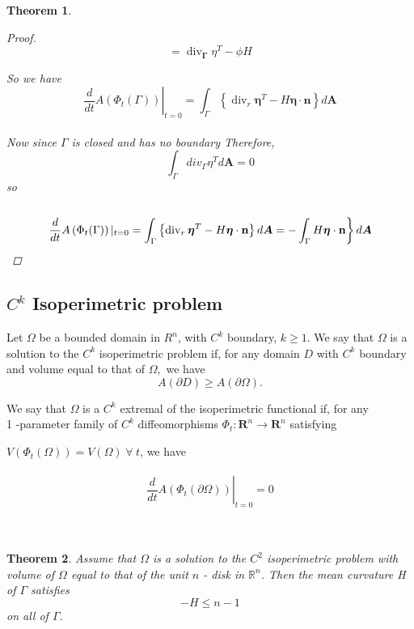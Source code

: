 \documentclass[oneside]{book}
\newtheorem{theorem}{Theorem}[section]
\begin{document}
\begin{theorem}
\begin{proof}
			
			
			
			$$
			{=\operatorname{div}_{\mathbf{\Gamma}} {\eta}^{T}-{\phi}{H}}
			$$
			
			So we have \\
			$$
			\left.\frac{d}{d t} A\left(\Phi_{t}(\Gamma)\right)\right|_{t=0}=\int_{\Gamma}\left\{\operatorname{div}_{r} \boldsymbol{\eta}^{T}-H \boldsymbol{\eta} \cdot \mathbf{n}\right\} d \boldsymbol{A}
			$$ \\
			
			
			
			
			Now since $\Gamma$ is closed and has no boundary Therefore, $$\int_{\Gamma}div_{\Gamma}\eta^{T}d\textbf{A} = 0$$
			so \\\\
			\begin{equation}
			\label{eq33}
			\left.\frac{d}{d t} A\left(\Phi_{t}(\Gamma)\right)|_{t=0}=\int_{\Gamma}\left\{\operatorname{div}_{r} \boldsymbol{\eta}^{T}-H \boldsymbol{\eta} \cdot \mathbf{n}\right\} d \boldsymbol{A}= -\int_{\Gamma}H \boldsymbol{\eta} \cdot \mathbf{n}\right\} d \boldsymbol{A}   \\\\
			\end{equation}
		\end{proof}
	\end{theorem}
	\subsection{$C^{k}$ Isoperimetric problem} 
	\label{ss:15}
	Let $\Omega$ be a bounded domain in $R^{n}$, with $C^{k}$ boundary, $k \geq 1 .$ We
	say that $\Omega$ is a solution to the $C^{k}$ isoperimetric problem if, for any domain $D$
	with $C^{k}$ boundary and volume equal to that of $\Omega,$ we have $$A(\partial D) \geq A(\partial \Omega) .$$
	
	We say that $\Omega$ is a
	$C^{k}$ extremal of the isoperimetric functional if, for any \\ 1 -parameter family of
	$C^{k}$ diffeomorphisms $\Phi_{t}: \mathbf{R}^{n} \rightarrow \mathbf{R}^{n}$ satisfying \par $V\left(\Phi_{t}(\Omega)\right)=V(\Omega)  \hspace{3pt}\forall \hspace{3pt} t$, we
	have \\\\
	\begin{equation}
	\label{eq34}
	\left.\frac{d}{d t} A\left(\Phi_{t}(\partial \Omega)\right)\right|_{t=0}=0
	\end{equation}
	\\\\
	\begin{theorem}
		\label{t:4}
		Assume that $\Omega$ is a solution to the $C^{2}$ isoperimetric problem
		with volume of $\Omega$ equal to that of the unit $n$ - disk in $\mathbb{R}^{n}$. Then the mean curvature
		H of $\Gamma$ satisfies
		$$
		-H \leq n-1
		$$
		on all of $\Gamma$.
	\end{theorem}
	
\end{document}
